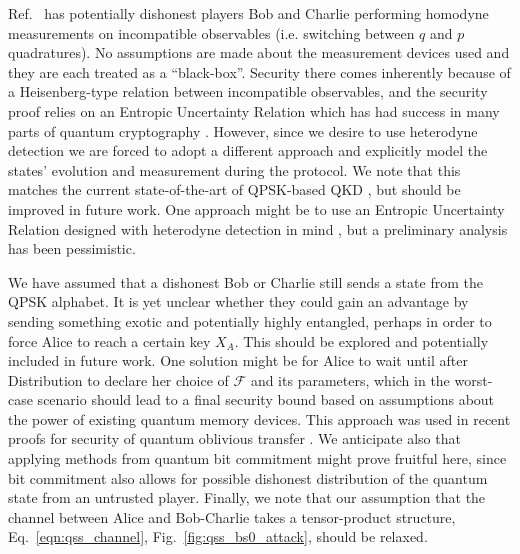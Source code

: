 Ref.~\cite{Kogias2017} has potentially dishonest players Bob and Charlie performing homodyne measurements on incompatible observables (i.e. switching between $q$ and $p$ quadratures). No assumptions are made about the measurement devices used and they are each treated as a ``black-box''. Security there comes inherently because of a Heisenberg-type relation between incompatible observables, and the security proof relies on an Entropic Uncertainty Relation which has had success in many parts of quantum cryptography \cite{Furrer2012, Furrer2017}. However, since we desire to use heterodyne detection we are forced to adopt a different approach and explicitly model the states' evolution and measurement during the protocol. We note that this matches the current state-of-the-art of QPSK-based QKD \cite{Papanastasiou2018}, but should be improved in future work. One approach might be to use an Entropic Uncertainty Relation designed with heterodyne detection in mind \cite{DePalma2017i, DePalma2017}, but a preliminary analysis has been pessimistic.

We have assumed that a dishonest Bob or Charlie still sends a state from the QPSK alphabet. It is yet unclear whether they could gain an advantage by sending something exotic and potentially highly entangled, perhaps in order to force Alice to reach a certain key $X_A$. This should be explored and potentially included in future work. One solution might be for Alice to wait until after Distribution to declare her choice of $\mathcal{F}$ and its parameters, which in the worst-case scenario should lead to a final security bound based on assumptions about the power of existing quantum memory devices. This approach was used in recent proofs for security of quantum oblivious transfer \cite{Furrer2017, Broadbent2015}. We anticipate also that applying methods from quantum bit commitment \cite{Broadbent2015} might prove fruitful here, since bit commitment also allows for possible dishonest distribution of the quantum state from an untrusted player. Finally, we note that our assumption that the channel between Alice and Bob-Charlie takes a tensor-product structure, Eq.~\ref{eqn:qss_channel}, Fig.~\ref{fig:qss_bs0_attack}, should be relaxed. %

